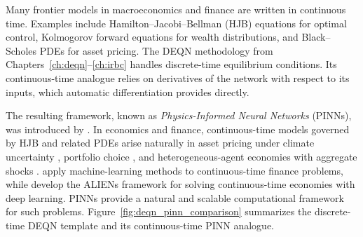 \documentclass[11pt,a4paper]{report}
\begin{document}
Many frontier models in macroeconomics and finance are written in continuous time.  Examples include Hamilton--Jacobi--Bellman (HJB) equations for optimal control, Kolmogorov forward equations for wealth distributions, and Black--Scholes PDEs for asset pricing.  The DEQN methodology from Chapters~\ref{ch:deqn}--\ref{ch:irbc} handles discrete-time equilibrium conditions.  Its continuous-time analogue relies on derivatives of the network with respect to its inputs, which automatic differentiation provides directly.

The resulting framework, known as \emph{Physics-Informed Neural Networks} (PINNs), was introduced by \citet{raissi2019physics}.  In economics and finance, continuous-time models governed by HJB and related PDEs arise naturally in asset pricing under climate uncertainty \citep{barnett2020pricing}, portfolio choice \citep{duarte2024ml}, and heterogeneous-agent economies with aggregate shocks \citep{gopalakrishna2024aliens}.  \citet{duarte2024ml} apply machine-learning methods to continuous-time finance problems, while \citet{gopalakrishna2024aliens} develop the ALIENs framework for solving continuous-time economies with deep learning.  PINNs provide a natural and scalable computational framework for such problems.  Figure~\ref{fig:deqn_pinn_comparison} summarizes the discrete-time DEQN template and its continuous-time PINN analogue.
\end{document}
